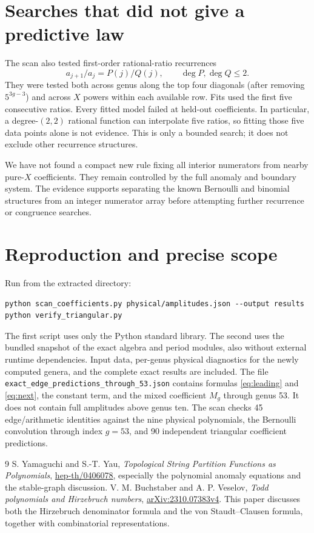\documentclass[11pt]{article}
\begin{document}
\section{Searches that did not give a predictive law}
The scan also tested first-order rational-ratio recurrences
\[
 a_{j+1}/a_j=P(j)/Q(j),\qquad\deg P,\deg Q\le2.
\]
They were tested both across genus along the top four diagonals (after
removing $5^{3g-3}$) and across $X$ powers within each available row.
Fits used the first five consecutive ratios. Every fitted model failed at
held-out coefficients. In particular, a degree-$(2,2)$ rational function can
interpolate five ratios, so fitting those five data points alone is not evidence.
This is only a bounded search; it does not exclude other recurrence structures.

We have not found a compact new rule fixing all interior numerators from
nearby pure-$X$ coefficients. They remain controlled by the full anomaly and
boundary system. The evidence supports separating the known Bernoulli and
binomial structures from an integer numerator array before attempting further
recurrence or congruence searches.

\section{Reproduction and precise scope}
Run from the extracted directory:
\begin{verbatim}
python scan_coefficients.py physical/amplitudes.json --output results
python verify_triangular.py
\end{verbatim}
The first script uses only the Python standard library. The second uses the
bundled snapshot of the exact algebra and period modules, also without external
runtime dependencies. Input data, per-genus physical diagnostics for the newly
computed genera, and the complete exact results are included.
The file \texttt{exact\_edge\_predictions\_through\_53.json} contains
formulas \eqref{eq:leading} and \eqref{eq:next}, the constant term, and the
mixed coefficient $M_g$ through genus 53. It does not contain full amplitudes
above genus ten. The scan checks 45 edge/arithmetic identities against the
nine physical polynomials, the Bernoulli convolution through index $g=53$,
and 90 independent triangular coefficient predictions.

\begin{thebibliography}{9}
 S. Yamaguchi and S.-T. Yau,
\emph{Topological String Partition Functions as Polynomials},
\href{https://arxiv.org/abs/hep-th/0406078}{hep-th/0406078},
especially the polynomial anomaly equations and the stable-graph discussion.
 V. M. Buchstaber and A. P. Veselov,
\emph{Todd polynomials and Hirzebruch numbers},
\href{https://arxiv.org/abs/2310.07383}{arXiv:2310.07383v4}.
This paper discusses both the Hirzebruch denominator formula and the
von Staudt--Clausen formula, together with combinatorial representations.
\end{thebibliography}
\end{document}
